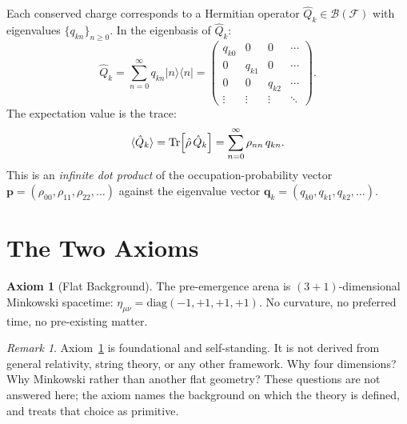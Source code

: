 \documentclass[12pt,a4paper]{article}
\theoremstyle{definition}
\newtheorem{axiom}{Axiom}
\theoremstyle{remark}
\newtheorem{remark}[theorem]{Remark}
\newcommand{\rhohat}{\hat{\rho}}
\newcommand{\Qhat}{\hat{Q}}
\newcommand{\Fock}{\mathcal{F}}
\begin{document}
Each conserved charge corresponds to a Hermitian operator
$\Qhat_k \in \mathcal{B}(\Fock)$ with eigenvalues $\{q_{kn}\}_{n\geq 0}$.
In the eigenbasis of $\Qhat_k$:
\begin{equation}\label{eq:Q_matrix}
  \Qhat_k = \sum_{n=0}^\infty q_{kn}|n\rangle\langle n|
  = \begin{pmatrix}
    q_{k0} & 0 & 0 & \cdots \\
    0 & q_{k1} & 0 & \cdots \\
    0 & 0 & q_{k2} & \cdots \\
    \vdots & \vdots & \vdots & \ddots
  \end{pmatrix}.
\end{equation}
The expectation value is the trace:
\begin{equation}\label{eq:trace_form}
  \langle \Qhat_k \rangle = \Tr[\rhohat\,\Qhat_k]
  = \sum_{n=0}^\infty \rho_{nn}\, q_{kn}.
\end{equation}
This is an \emph{infinite dot product} of the occupation-probability vector
$\mathbf{p} = (\rho_{00}, \rho_{11}, \rho_{22}, \ldots)$ against the
eigenvalue vector $\mathbf{q}_k = (q_{k0}, q_{k1}, q_{k2},\ldots)$.

\section{The Two Axioms}
\label{sec:axioms}

\begin{axiom}[Flat Background]\label{ax:flat}
The pre-emergence arena is $(3{+}1)$-dimensional Minkowski spacetime:
$\eta_{\mu\nu} = \mathrm{diag}(-1,+1,+1,+1)$.
No curvature, no preferred time, no pre-existing matter.
\end{axiom}

\begin{remark}
Axiom~\ref{ax:flat} is foundational and self-standing.
It is not derived from general relativity, string theory, or any other
framework. Why four dimensions? Why Minkowski rather than another flat
geometry? These questions are not answered here; the axiom names the
background on which the theory is defined, and treats that choice as
primitive.
\end{remark}
\end{document}

